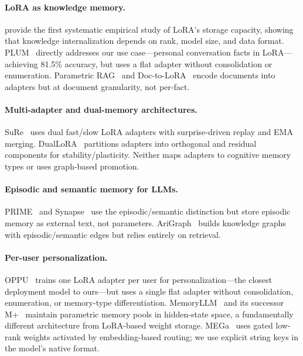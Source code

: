 \documentclass[11pt]{article}
\begin{document}
\paragraph{LoRA as knowledge memory.}
\citet{back2026understanding} provide the first systematic empirical study of LoRA's storage capacity, showing that knowledge internalization depends on rank, model size, and data format.
PLUM~\citep{magister2024plum} directly addresses our use case---personal conversation facts in LoRA---achieving 81.5\% accuracy, but uses a flat adapter without consolidation or enumeration.
Parametric RAG~\citep{su2025prag} and Doc-to-LoRA~\citep{charakorn2026doctolora} encode documents into adapters but at document granularity, not per-fact.

\paragraph{Multi-adapter and dual-memory architectures.}
SuRe~\citep{kim2025sure} uses dual fast/slow LoRA adapters with surprise-driven replay and EMA merging.
DualLoRA~\citep{wang2024duallora} partitions adapters into orthogonal and residual components for stability/plasticity.
Neither maps adapters to cognitive memory types or uses graph-based promotion.

\paragraph{Episodic and semantic memory for LLMs.}
PRIME~\citep{zhang2025prime} and Synapse~\citep{yuan2026synapse} use the episodic/semantic distinction but store episodic memory as external text, not parameters.
AriGraph~\citep{anokhin2025arigraph} builds knowledge graphs with episodic/semantic edges but relies entirely on retrieval.

\paragraph{Per-user personalization.}
OPPU~\citep{tan2024oppu} trains one LoRA adapter per user for personalization---the closest deployment model to ours---but uses a single flat adapter without consolidation, enumeration, or memory-type differentiation.
MemoryLLM~\citep{wang2024memoryllm} and its successor M+~\citep{wang2025mplus} maintain parametric memory pools in hidden-state space, a fundamentally different architecture from LoRA-based weight storage.
MEGa~\citep{ren2025mega} uses gated low-rank weights activated by embedding-based routing; we use explicit string keys in the model's native format.
\end{document}
